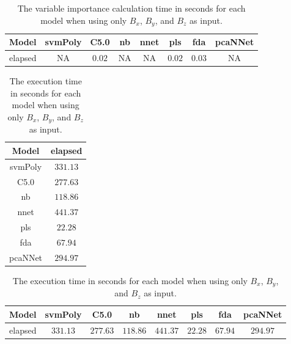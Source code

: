 \begin{table}[!ht]
	\centering
	\begin{tabular}{|c|c|c|c|c|c|c|c|}
		\hline
		Model & svmPoly & C5.0 & nb & nnet & pls & fda & pcaNNet \\ \hline
		elapsed & NA & $0.02$ & NA & NA & $0.02$ & $0.03$ & NA \\ \hline
	\end{tabular}
	\caption{The variable importance calculation time in seconds for each model when using only $B_{x}$, $B_{y}$, and $B_{z}$ as input.}
	\label{tab:time:reverse:coord:importance}
\end{table}

\begin{table}[!ht]
	\centering
	\begin{tabular}{|c|c|}
		\hline
		Model & elapsed \\ \hline
		svmPoly & $331.13$ \\ \hline
		C5.0 & $277.63$ \\ \hline
		nb & $118.86$ \\ \hline
		nnet & $441.37$ \\ \hline
		pls & $22.28$ \\ \hline
		fda & $67.94$ \\ \hline
		pcaNNet & $294.97$ \\ \hline
	\end{tabular}
	\caption{The execution time in seconds for each model when using only $B_{x}$, $B_{y}$, and $B_{z}$ as input.}
	\label{tab:time:coord:total}
\end{table}

\begin{table}[!ht]
	\centering
	\begin{tabular}{|c|c|c|c|c|c|c|c|}
		\hline
		Model & svmPoly & C5.0 & nb & nnet & pls & fda & pcaNNet \\ \hline
		elapsed & $331.13$ & $277.63$ & $118.86$ & $441.37$ & $22.28$ & $67.94$ & $294.97$ \\ \hline
	\end{tabular}
	\caption{The execution time in seconds for each model when using only $B_{x}$, $B_{y}$, and $B_{z}$ as input.}
	\label{tab:time:reverse:coord:total}
\end{table}

